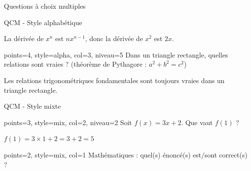 \documentclass[theme=vert]{nfdevoirs}
\begin{document}
\begin{devoir}
\begin{partie}{Questions à choix multiples}
\begin{exercice}{QCM - Style alphabétique}
            \begin{correction}
                La dérivée de $x^n$ est $nx^{n-1}$, donc la dérivée de $x^2$ est $2x$.
            \end{correction}

            \begin{qcm}{points=4, style=alpha, col=3, niveau=5}
                Dans un triangle rectangle, quelles relations sont vraies ? (théorème de Pythagore : $a^2 + b^2 = c^2$)
                \begin{choix}
                    \proposition*{$\tan(\theta) = \frac{\sin(\theta)}{\cos(\theta)}$}
                \end{choix}
            \end{qcm}

            \begin{correction}
                Les relations trigonométriques fondamentales sont toujours vraies dans un triangle rectangle.
            \end{correction}

        \end{exercice}

        \begin{exercice}{QCM - Style mixte}

            \begin{qcm}{points=3, style=mix, col=2, niveau=2}
                Soit $f(x) = 3x + 2$. Que vaut $f(1)$ ?
                \begin{choix}
                \end{choix}
            \end{qcm}

            \begin{correction}
                $f(1) = 3 \times 1 + 2 = 3 + 2 = 5$
            \end{correction}

            \begin{qcm}{points=2, style=mix, col=1}
                Mathématiques : quel(s) énoncé(s) est/sont correct(s) ?


\end{qcm}
\end{exercice}
\end{partie}
\end{devoir}
\end{document}
